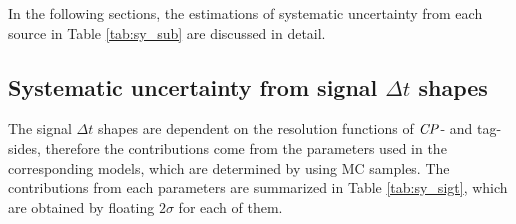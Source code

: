 In the following sections, the estimations of systematic uncertainty from each source in Table \ref{tab:sy_sub} are discussed in detail.

\subsection{Systematic uncertainty from signal $\Delta t$ shapes}
The signal $\Delta t$ shapes are dependent on the resolution functions of $\it{CP}$- and tag-sides, therefore the contributions come from the parameters used in the corresponding models, which are determined by using MC samples. The contributions from each parameters are summarized in Table \ref{tab:sy_sigt}, which are obtained by floating $2\sigma$ for each of them.


